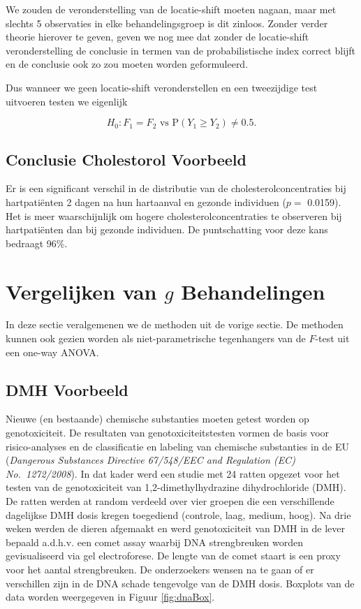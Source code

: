 \documentclass[
  12pt,dutch]{book}
\theoremstyle{definition}
\theoremstyle{definition}
\theoremstyle{definition}
\theoremstyle{definition}
\theoremstyle{remark}
\begin{document}
We zouden de veronderstelling van de locatie-shift moeten nagaan, maar met slechts 5 observaties in elke behandelingsgroep is dit zinloos. Zonder verder theorie hierover te geven, geven we nog mee dat zonder de locatie-shift veronderstelling de conclusie in termen van de probabilistische index correct blijft en de conclusie ook zo zou moeten worden geformuleerd.

Dus wanneer we geen locatie-shift veronderstellen en een tweezijdige test uitvoeren testen we eigenlijk

\[H_0: F_1=F_2 \text{ vs P}(Y_1 \geq Y_2) \neq 0.5.\]

\subsection{Conclusie Cholestorol Voorbeeld}\label{conclusie-cholestorol-voorbeeld}

Er is een significant verschil in de distributie van de cholesterolconcentraties bij hartpatiënten 2 dagen na hun hartaanval en gezonde individuen (\(p=\) 0.0159). Het is meer waarschijnlijk om hogere cholesterolconcentraties te observeren bij hartpatiënten dan bij gezonde individuen. De puntschatting voor deze kans bedraagt 96\%.

\section{\texorpdfstring{Vergelijken van \(g\) Behandelingen}{Vergelijken van g Behandelingen}}\label{vergelijken-van-g-behandelingen}

In deze sectie veralgemenen we de methoden uit de vorige sectie.
De methoden kunnen ook gezien worden
als niet-parametrische tegenhangers van de \(F\)-test uit een one-way ANOVA.

\subsection{DMH Voorbeeld}\label{dmh-voorbeeld}

Nieuwe (en bestaande) chemische substanties moeten getest worden op genotoxiciteit. De resultaten van genotoxiciteitstesten vormen de basis voor risico-analyses en de classificatie en labeling van chemische substanties in de EU (\emph{Dangerous Substances Directive 67/548/EEC and Regulation (EC) No.~1272/2008}). In dat kader werd een studie met 24 ratten opgezet voor het testen van de genotoxiciteit van 1,2-dimethylhydrazine dihydrochloride (DMH).
De ratten werden at random verdeeld over vier groepen die een verschillende dagelijkse DMH dosis kregen toegediend (controle, laag, medium, hoog).
Na drie weken werden de dieren afgemaakt en werd genotoxiciteit van DMH in de lever bepaald a.d.h.v. een comet assay waarbij DNA strengbreuken worden gevisualiseerd via gel electroforese.
De lengte van de comet staart is een proxy voor het aantal strengbreuken.
De onderzoekers wensen na te gaan of er verschillen zijn in de DNA schade tengevolge van de DMH dosis.
Boxplots van de data worden weergegeven in Figuur \ref{fig:dnaBox}.
\end{document}
